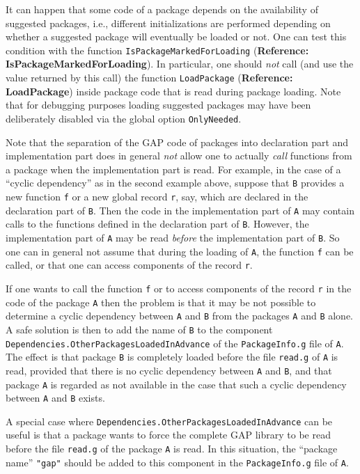 \documentclass[a4paper,11pt]{report}
\begin{document}
{{  It can happen that some code of a package depends on the availability of
suggested packages, i.e., different initializations are performed depending on
whether a suggested package will eventually be loaded or not. One can test
this condition with the function \texttt{IsPackageMarkedForLoading} (\textbf{Reference: IsPackageMarkedForLoading}). In particular, one should \emph{not} call (and use the value returned by this call) the function \texttt{LoadPackage} (\textbf{Reference: LoadPackage}) inside package code that is read during package loading. Note that for
debugging purposes loading suggested packages may have been deliberately
disabled via the global option \texttt{OnlyNeeded}. 

 Note that the separation of the \textsf{GAP} code of packages into declaration part and implementation part does in general \emph{not} allow one to actually \emph{call} functions from a package when the implementation part is read. For example, in
the case of a ``cyclic dependency'' as in the second example above, suppose that \texttt{B} provides a new function \texttt{f} or a new global record \texttt{r}, say, which are declared in the declaration part of \texttt{B}. Then the code in the implementation part of \texttt{A} may contain calls to the functions defined in the declaration part of \texttt{B}. However, the implementation part of \texttt{A} may be read \emph{before} the implementation part of \texttt{B}. So one can in general not assume that during the loading of \texttt{A}, the function \texttt{f} can be called, or that one can access components of the record \texttt{r}. 

 If one wants to call the function \texttt{f} or to access components of the record \texttt{r} in the code of the package \texttt{A} then the problem is that it may be not possible to determine a cyclic
dependency between \texttt{A} and \texttt{B} from the packages \texttt{A} and \texttt{B} alone. A safe solution is then to add the name of \texttt{B} to the component \texttt{Dependencies.OtherPackagesLoadedInAdvance} of the \texttt{PackageInfo.g} file of \texttt{A}. The effect is that package \texttt{B} is completely loaded before the file \texttt{read.g} of \texttt{A} is read, provided that there is no cyclic dependency between \texttt{A} and \texttt{B}, and that package \texttt{A} is regarded as not available in the case that such a cyclic dependency between \texttt{A} and \texttt{B} exists. 

 A special case where \texttt{Dependencies.OtherPackagesLoadedInAdvance} can be useful is that a package wants to force the complete \textsf{GAP} library to be read before the file \texttt{read.g} of the package \texttt{A} is read. In this situation, the ``package name'' \texttt{"gap"} should be added to this component in the \texttt{PackageInfo.g} file of \texttt{A}. 

}}
\end{document}
